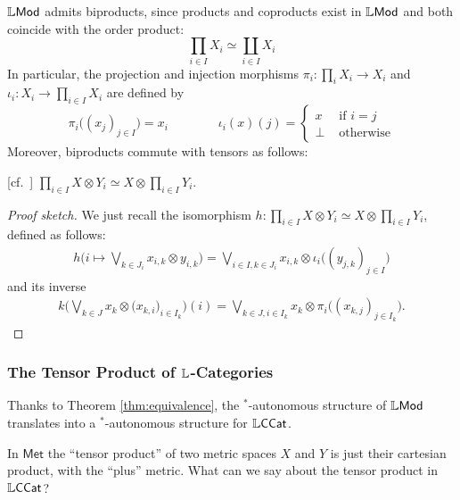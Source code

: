 $\mathbb{L}\mathsf{Mod}$ admits biproducts, since products and coproducts exist in $\mathbb{L}\mathsf{Mod}$ and both coincide with the order product:
$$
\prod_{i\in I}X_{i} \simeq \coprod_{i\in I}X_{i}
$$
In particular, the projection and
 injection morphisms $\pi_{i}:\prod_{i}X_{i}\to X_{i}$ and $\iota_{i}:X_{i} \to \prod_{i\in I}X_{i}$ are defined by 
$$
\pi_{i}\big( (x_{j})_{j\in I}\big) = x_{i} \qquad \qquad
\iota_{i}(x)({j})= \begin{cases} x & \text{ if }i=j\\ \bot & \text{ otherwise}\end{cases}
$$
Moreover, biproducts commute with tensors as follows:
\begin{proposition}\label{prop:productvstensor}[cf.~\cite{Russo2007}]
$\prod_{i\in I} X\otimes Y_{i} \simeq X \otimes \prod_{i\in I}Y_{i}$.
\end{proposition}
\begin{proof}[Proof sketch]
We just recall the isomorphism 
$h: \prod_{i\in I} X\otimes Y_{i} \simeq X \otimes \prod_{i\in I}Y_{i}$, defined as follows:
\begin{align*}
h\Big( i\mapsto \bigvee_{k\in J_{i}}x_{i,k}\otimes y_{i,k}\Big ) = 
\bigvee_{i\in I,k\in J_{i}}x_{i,k} \otimes \iota_{i}\big( (y_{j,k})_{j\in I}\big)
\end{align*}
and its inverse
\begin{align*}
k\Big( \bigvee_{k\in J}x_{k}\otimes \big(x_{k,i}\big)_{i\in I_{k}}\Big)(i)=
\bigvee_{k\in J,i\in I_{k}}x_{k}\otimes \pi_{i}\big((x_{k,j})_{j\in I_{k}}\big).
\end{align*}
\end{proof}



\subsubsection{The Tensor Product of $\mathbb{L}$-Categories}



Thanks to Theorem \ref{thm:equivalence}, the $^{*}$-autonomous structure of $\mathbb{L}\mathsf{Mod}$ translates into a $^{*}$-autonomous structure for $\mathbb{L}\mathsf{CCat}$.

In $\mathsf{Met}$ the ``tensor product'' of two metric spaces $X$ and $Y$ is just their cartesian product, with the ``plus'' metric. What can we say about the tensor product in $\mathbb{L}\mathsf{CCat}$?

